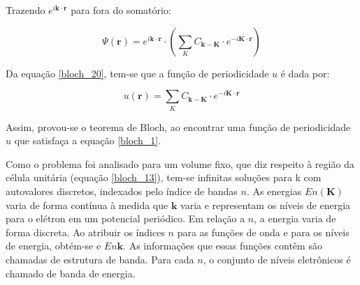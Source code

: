 	\par Trazendo $e^{i\mathbf{k} \cdot \mathbf{r}}$ para fora do somatório:

	\begin{equation}
		\label{bloch_20}
		\Psi (\mathbf{r}) = e^{i\mathbf{k}\cdot\mathbf{r}} \cdot \left(\sum_{K} C_{\mathbf{k-K}}\cdot e^{-i \mathbf{K}\cdot\mathbf{r}}\right)
	\end{equation}

	\par Da equação \eqref{bloch_20}, tem-se que a função de periodicidade $u$ é dada por:

	\begin{equation}
		\label{bloch_21}
		u(\mathbf{r}) = \sum_{K} C_{\mathbf{k-K}}\cdot e^{-i \mathbf{K}\cdot\mathbf{r}}
	\end{equation}

	\par Assim, provou-se o teorema de Bloch, ao encontrar uma função de periodicidade $u$ que satisfaça a equação \eqref{bloch_1}.

	\par Como o problema foi analisado para um volume fixo, que diz respeito à região da célula unitária (equação \eqref{bloch_13}), tem-se infinitas soluções para k  com autovalores discretos, indexados pelo índice de bandas $n$. As energias $En(\mathbf{K})$ varia de forma contínua à medida que $\mathbf{k}$ varia e representam os níveis de energia para o elétron em um potencial periódico. Em relação a $n$, a energia varia de forma discreta. Ao atribuir os índices $n$ para as funções de onda e para os níveis de energia, obtém-se e $E n\mathbf{k}$. As informações que essas funções contêm são chamadas de estrutura de banda. Para cada $n$, o conjunto de níveis eletrônicos é chamado de banda de energia\cite{qm_fis5}. 

